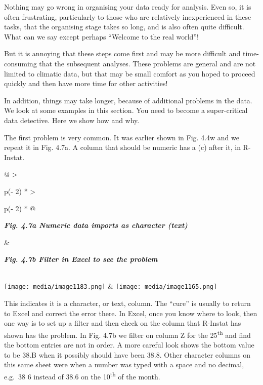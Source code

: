 \documentclass[
  letterpaper,
  DIV=11,
  numbers=noendperiod]{scrreprt}
\begin{document}
Nothing may go wrong in organising your data ready for analysis. Even
so, it is often frustrating, particularly to those who are relatively
inexperienced in these tasks, that the organising stage takes so long,
and is also often quite difficult. What can we say except perhaps
``Welcome to the real world''!

But it is annoying that these steps come first and may be more difficult
and time-consuming that the subsequent analyses. These problems are
general and are not limited to climatic data, but that may be small
comfort as you hoped to proceed quickly and then have more time for
other activities!

In addition, things may take longer, because of additional problems in
the data. We look at some examples in this section. You need to become a
super-critical data detective. Here we show how and why.

The first problem is very common. It was earlier shown in Fig. 4.4w and
we repeat it in Fig. 4.7a. A column that should be numeric has a (c)
after it, in R-Instat.

\begin{longtable}[]{@{}
  >{\raggedright\arraybackslash}p{(\columnwidth - 2\tabcolsep) * }
  >{\raggedright\arraybackslash}p{(\columnwidth - 2\tabcolsep) * }@{}}
\toprule\noalign{}
\begin{minipage}[b]{\linewidth}\raggedright
\textbf{\emph{Fig. 4.7a Numeric data imports as character (text)}}
\end{minipage} & \begin{minipage}[b]{\linewidth}\raggedright
\textbf{\emph{Fig. 4.7b Filter in Excel to see the problem}}
\end{minipage} \\
\midrule\noalign{}
\endhead
\bottomrule\noalign{}
\endlastfoot
\texttt{[image: media/image1183.png]}
&
\texttt{[image: media/image1165.png]} \\
\end{longtable}

This indicates it is a character, or text, column. The ``cure'' is
usually to return to Excel and correct the error there. In Excel, once
you know where to look, then one way is to set up a filter and then
check on the column that R-Instat has shown has the problem. In Fig.
4.7b we filter on column Z for the 25\textsuperscript{th} and find the
bottom entries are not in order. A more careful look shows the bottom
value to be 38.B when it possibly should have been 38.8. Other character
columns on this same sheet were when a number was typed with a space and
no decimal, e.g.~38 6 instead of 38.6 on the 10\textsuperscript{th} of
the month.
\end{document}
